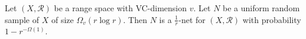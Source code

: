 \begin{lemma}[label=thm:enet-general]
	Let \((X, \mathcal{R})\) be a range space with VC-dimension \(v\).
	Let \(N\) be a uniform random sample of \(X\) of size
	\(\Omega_v(r \log r)\).
	Then \(N\) is a \(\frac 1r\)-net
	for \((X, \mathcal{R})\)
	with probability \(1-r^{-\Omega(1)}\).
\end{lemma}
